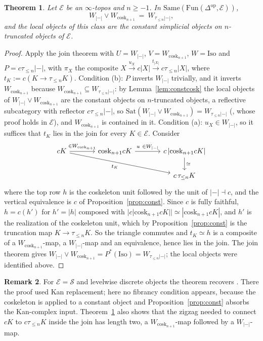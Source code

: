 \documentclass[11pt]{amsart}
\newtheorem{thm}{Theorem}[section]
\theoremstyle{definition}
\newtheorem{rem}[thm]{Remark}
\newcommand{\Same}{\mathrm{Same}}
\newcommand{\Iso}{\mathrm{Iso}}
\newcommand{\Sat}{\mathrm{Sat}}
\newcommand{\cosk}{\mathrm{cosk}}
\newcommand{\Fun}{\mathrm{Fun}}
\newcommand{\sS}{\mathcal S}
\newcommand{\E}{\mathcal E}
\newcommand{\tr}[1]{\tau_{\le #1}}
\newcommand{\re}{|{-}|}
\begin{document}
\begin{thm}\label{thm:A}
Let $\E$ be an $\infty$-topos and $n\ge-1$. In $\Same(\Fun(\Delta^{\mathrm{op}},\E))$,
\[
W_{\re}\vee W_{\cosk_{n+1}}\ =\ W_{\tr n\re},
\]
and the local objects of this class are the constant simplicial objects on
$n$-truncated objects of $\E$.
\end{thm}
\begin{proof}
Apply the join theorem with $U=W_{\re}$, $V=W_{\cosk_{n+1}}$, $W=\Iso$ and
$P=c\tr n\re$, with $\pi_X$ the composite $X\xrightarrow{u_X}c|X|
\xrightarrow{t_{|X|}}c\tr n|X|$, where $t_K:=c(K\to\tr nK)$. Condition (b):
$P$ inverts $W_{\re}$ trivially, and it inverts $W_{\cosk_{n+1}}$ because
$W_{\cosk_{n+1}}\subseteq W_{\tr n\re}$: by Lemma~\ref{lem:constcosk} the local
objects of $W_{\re}\vee W_{\cosk_{n+1}}$ are the constant objects on
$n$-truncated objects, a reflective subcategory with reflector $c\tr n\re$,
so $\Sat(W_{\re}\vee W_{\cosk_{n+1}})=W_{\tr n\re}$ (\cite[Thm.~8.3]{Topjoin},
whose proof holds in $\E$), and $W_{\cosk_{n+1}}$ is contained in it.
Condition (a): $u_X\in W_{\re}$, so it suffices that $t_K$ lies in the join
for every $K\in\E$. Consider
\[
\begin{tikzcd}[column sep=large]
cK\arrow[r,"\in W_{\cosk_{n+1}}"]\arrow[drr,"t_K"'] & \cosk_{n+1}cK\arrow[r,"u\ \in W_{\re}"] &
c\,|\cosk_{n+1}cK|\arrow[d,"\simeq"]\\
& & c\,\tr nK
\end{tikzcd}
\]
where the top row $h$ is the coskeleton unit followed by the unit of
$\re\dashv c$, and the vertical equivalence is $c$ of
Proposition~\ref{prop:const}. Since $c$ is fully faithful, $h=c(h')$ for
$h'=|h|$ composed with $|c|\cosk_{n+1}cK||\simeq|\cosk_{n+1}cK|$, and $h'$ is
the realization of the coskeleton unit, which by Proposition~\ref{prop:const}
is the truncation map $K\to\tr nK$. So the triangle commutes and
$t_K\simeq h$ is a composite of a $W_{\cosk_{n+1}}$-map, a $W_{\re}$-map and an
equivalence, hence lies in the join. The join theorem gives
$W_{\re}\vee W_{\cosk_{n+1}}=P^*(\Iso)=W_{\tr n\re}$; the local objects were
identified above.
\end{proof}

\begin{rem}
For $\E=\sS$ and levelwise discrete objects the theorem recovers
\cite[Thm.~7.2]{Postnikov}. There the proof used Kan replacement; here no
fibrancy condition appears, because the coskeleton is applied to a constant
object and Proposition~\ref{prop:const} absorbs the Kan-complex input.
Theorem~\ref{thm:A} also shows that the zigzag needed to connect $cK$ to
$c\tr nK$ inside the join has length two, a $W_{\cosk_{n+1}}$-map followed by a
$W_{\re}$-map.
\end{rem}
\end{document}
